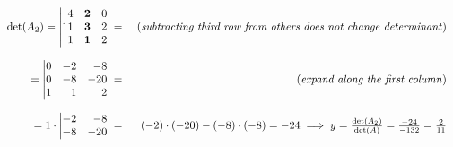 \documentclass[8pt]{article} %
\begin{document}
\begin{description}
{			\[\begin{array}{rr}
			\det(A_2)=\begin{vmatrix*}[r]4&\mathbf{2}&0\\11&\mathbf{3}&2\\1&\mathbf{1}&2\end{vmatrix*}
			= &\mbox{ (\textit{subtracting third row from others does not change determinant})}\\\\
			=\begin{vmatrix*}[r]0&-2&-8\\0&-8&-20\\1&{1}&2\end{vmatrix*}
			= &\mbox{ (\textit{expand along the first column})}\\\\
			=1\cdot
			\begin{vmatrix*}[r]-2&-8\\-8&-20\end{vmatrix*}=&(-2)\cdot(-20)-(-8)\cdot(-8)=-24\implies y=\frac{\det(A_2)}{\det(A)}=
				\frac{-24}{-132}=\frac{2}{11}
			\end{array}\]

}
\end{description}
\end{document}
